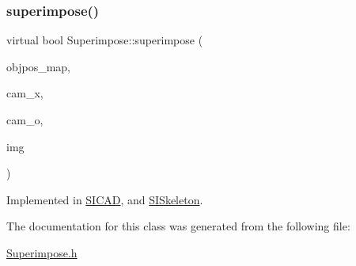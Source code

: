 \subsubsection{\texorpdfstring{superimpose()}{superimpose()}}
{\footnotesize\ttfamily virtual bool Superimpose\+::superimpose (\begin{DoxyParamCaption}\item[{const \mbox{\hyperlink{classSuperimpose_a178e3d4e2def6635bfcf9454dd4b5d22}{Model\+Pose\+Container}} \&}]{objpos\+\_\+map,  }\item[{const double $\ast$}]{cam\+\_\+x,  }\item[{const double $\ast$}]{cam\+\_\+o,  }\item[{cv\+::\+Mat \&}]{img }\end{DoxyParamCaption})\hspace{0.3cm}{\ttfamily [pure virtual]}}



Implemented in \mbox{\hyperlink{classSICAD_a356e0ac8a0f130952a72326bedd4ab60}{S\+I\+C\+AD}}, and \mbox{\hyperlink{classSISkeleton_a3f49fa3419370c2597435768f280c747}{S\+I\+Skeleton}}.



The documentation for this class was generated from the following file\+:\begin{DoxyCompactItemize}
\item 
\mbox{\hyperlink{Superimpose_8h}{Superimpose.\+h}}\end{DoxyCompactItemize}
